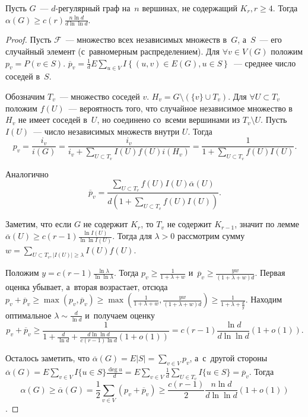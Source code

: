 \documentclass{article}
\begin{document}
\begin{theorem}[Ширер]
	Пусть $G$~--- $d$-регулярный граф на~$n$ вершинах, не содержащий $K_r, r \ge
	4$. Тогда $\alpha(G) \ge c(r) \frac{n \ln d}{d \ln \ln d}$.
\end{theorem}
\begin{proof}
	Пусть $\mathcal{F}$~--- множество всех независимых множеств в~$G$, а~$S$~---
	его случайный элемент (с~равномерным распределением). Для $\forall v \in V(G)$
	положим $p_v = P(v \in S)$. $\overline p_v = \frac{1}{d} E \sum\limits_{u \in
	V} I\left\{ (u, v) \in E(G), u \in S\right\}$~--- среднее число соседей в~$S$.

	Обозначим $T_v$~--- множество соседей $v$. $H_v = G \setminus (\{v\} \cup
	T_v)$. Для $\forall U \subset T_v$ положим $f(U)$~--- вероятность того, что
	случайное независимое множество в~$H_v$ не имеет соседей в~$U$, но соединено
	со~всеми вершинами из $T_v \setminus U$. Пусть $I(U)$~--- число независимых
	множеств внутри $U$. Тогда
	$$p_v = \frac{i_v}{i(G)} = \frac{i_v}{i_v +
	\sum\limits_{U \subset T_v} I(U) f(U) i(H_v)} = \frac{1}{1 +
	\sum\limits_{U \subset T_v} f(U) I(U)}.$$

	Аналогично $$ \overline p_v = \frac{\sum\limits_{U \subset T_v} f(U) I(U)
	\overline\alpha(U)}{d\left(1 + \sum\limits_{U \subset T_v} f(U) I(U)\right)}.
	$$

	Заметим, что если $G$ не содержит $K_r$, то $T_v$ не содержит $K_{r-1}$,
	значит по лемме $\overline\alpha(U) \ge c(r - 1)
	\frac{\ln I(U)}{\ln \ln I(U)}$. Тогда для $\lambda > 0$ рассмотрим сумму
	$w = \sum\limits_{U \subset T_v, |I(U)| \ge \lambda} I(U) f(U)$.

	Положим $y = c(r - 1) \frac{\ln \lambda}{\ln \ln \lambda}$. Тогда
	$p_v \ge \frac{1}{1 + \lambda + w}$ и~$\overline p_v \ge \frac{yw}{(1 +
	\lambda + w) d}$. Первая оценка убывает, а~вторая возрастает, отсюда $p_v +
	\overline p_v \ge \max(p_v, \overline p_v) \ge \max\left( \frac{1}{1 + \lambda
	+ w}, \frac{yw}{(1 + \lambda + w)d}\right) \ge \frac{1}{1 + \lambda +
	\frac{d}{y}}$. Находим оптимальное $\lambda \sim \frac{d}{\ln d}$ и~получаем
	оценку
	$$p_v + \overline p_v \ge \frac{1}{1 + \frac{d}{\ln d} + \frac{d \ln \ln
	d}{c(r-1)\ln d} (1 + o(1))} = c(r-1) \frac{\ln d}{d \ln \ln d} (1 + o(1)).$$

	Осталось заметить, что $\overline\alpha(G) = E|S| = \sum\limits_{v \in V}
	p_v$, а~с~другой стороны $\overline\alpha(G) = E\sum\limits_{v \in V} I\{u
	\in S\} \frac{\deg u}{d} = E \sum\limits_{v \in V} \frac{1}{d}
	\sum\limits_{U \in T_v} I\{u \in S\} = \overline p_v$. Тогда
	$$\alpha(G) \ge \overline \alpha(G) = \frac{1}{2} \sum\limits_{v \in V}
	(p_v + \overline p_v) \ge \frac{c(r-1)}{2} \frac{n \ln d}{d \ln \ln d}
	(1 + o(1))$$.
\end{proof}
\end{document}
